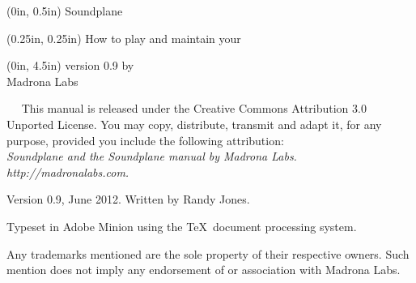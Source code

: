\begin{textblock*}{6in}(0in, 0.5in)
{
\centering
\madronachapfont \fontsize{80}{80}  \color{lightC}Soundplane\\
}
\end{textblock*}

\begin{textblock*}{5in}(0.25in, 0.25in)
{
\madronachapfont \fontsize{16}{16}  \color{darkC} How to play and maintain your
}
\end{textblock*}

\begin{textblock*}{6in}(0in, 4.5in)
{
\centering
\madronachapfont \fontsize{14}{22}  \color{darkC}version 0.9 by 
\\
\madronalogofont \fontsize{18}{24}  \color{darkC}Madrona Labs\\
}
\end{textblock*}

\clearpage



\thispagestyle{empty}
{
\raggedright
\ \ \vskip 2in
\noindent 
This manual is released under the Creative Commons Attribution 3.0 Unported License.  You may copy, distribute, transmit and adapt it, for any purpose, provided you include the following attribution: \\
{\itshape Soundplane and the Soundplane manual by Madrona Labs. 
http://madronalabs.com.}

\vspace{1 em}
\noindent 
Version 0.9, June 2012.  Written by Randy Jones.

\vspace{1 em}
\noindent 

\vspace{1 em}
\noindent 
Typeset in Adobe Minion using the \TeX \ document processing system. 

\vspace{1 em}
Any trademarks mentioned are the sole property of their respective owners.  Such mention does not imply any endorsement of or association with Madrona Labs. 
}


